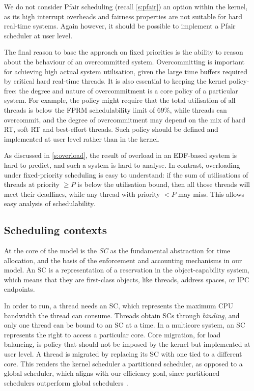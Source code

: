 We do not consider Pfair scheduling (recall \cref{s:pfair}) an option within the kernel, as its high interrupt
overheads and fairness properties are not suitable for hard real-time systems.  Again however, it
should be possible to implement a Pfair scheduler at user level.

The final reason to base the approach on fixed priorities is the ability
to reason about the behaviour of an
overcommitted system. Overcommitting is important for achieving high
actual system utilisation, given the large time buffers required by
critical hard real-time threads. It is also essential to keeping the kernel
policy-free: the degree and nature of overcommitment is a core policy
of a particular system. For example, the policy might require that the
total utilisation of all  threads is below the \gls{FPRM}
schedulability limit of 69\%, while  threads can overcommit,
and the degree of overcommitment may depend on the mix of hard RT,
soft RT and best-effort threads. Such policy should be defined and
implemented at user level rather than in the kernel.

As discussed in \cref{s:overload}, the result of overload in an
EDF-based system is hard to predict, and such a system is hard to
analyse. In contrast, overloading under fixed-priority scheduling is easy to
understand: if the sum of utilisations of threads at priority \(\geq
P\) is below the utilisation bound, then all those threads will meet
their deadlines, while any thread with priority \(<P\) may miss. This
allows easy analysis of schedulability.

\subsection{Scheduling contexts}
\label{sec:model-scheduling-contexts}

At the core of the model is the \emph{\gls{SC}} as the
fundamental abstraction for time allocation, and the basis of 
the enforcement and accounting mechanisms in our model.
An \gls{SC} is a representation
of a reservation in the object-capability system, which means that 
they are first-class objects, like threads, address spaces, or
\gls{IPC} endpoints. 

In order to run, a thread needs an \gls{SC}, which represents the
maximum CPU bandwidth the thread can consume. Threads obtain \glspl{SC} through \emph{binding}, and
only one thread can be bound to an \gls{SC} at a time.
In a multicore system, an SC represents the right to access a
particular core. Core migration, \eg for load balancing, is policy
that should not be imposed by the kernel but implemented at user
level. A thread is migrated by replacing its SC with one tied to a
different core. This renders the kernel scheduler a partitioned scheduler, as opposed to 
a global scheduler, which aligns with our efficiency goal, since partitioned schedulers outperform global
schedulers~\citep{Brandenburg:phd}.

